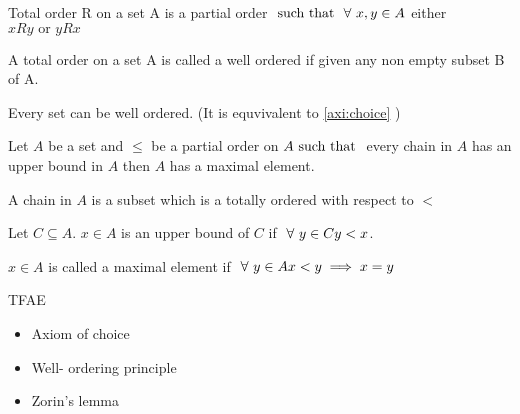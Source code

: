 \documentclass{book}
\begin{document}
\begin{definition}
  Total order R on a set A is a partial order \(\text{ such that } \ \forall \  x,y \in A\) either \(xRy \text{ or } yRx \)
\end{definition}

\begin{definition}
  A total order on a set A is called a well ordered if given any non empty subset B of A.
\end{definition}


\begin{theorem}
  Every set can be well ordered. (It is equvivalent to \autoref{axi:choice}  )
\end{theorem}

\begin{lemma}
  Let \(A\) be a set and \( \le \) be a partial order on \(A \text{ such that } \)
  every chain in \(A\) has an upper bound in \(A\) then \(A \) has a maximal element.
\end{lemma}
\begin{definition}[Chain]
  A chain in \(A\) is a subset which is a totally ordered with respect to \(<\)
\end{definition}
\begin{definition}
  Let \(C \subseteq A \). \(x \in A \) is an upper bound of \(C\) if \(\ \forall \  y \in C y < x\).
\end{definition}
\begin{definition}
  \(x \in A\) is called a maximal element if \( \ \forall \  y \in A x<y  \implies x=y\)
\end{definition}
\begin{theorem}
  TFAE
  \begin{itemize}
    \item Axiom of choice
    \item Well- ordering principle
    \item Zorin's lemma
  \end{itemize}
\end{theorem}
\end{document}
